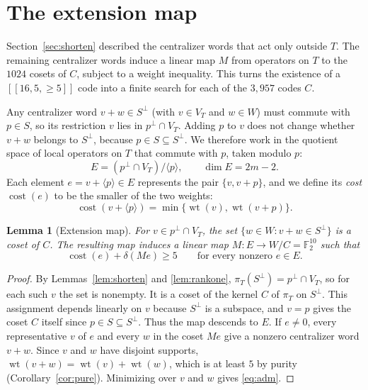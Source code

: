 \documentclass[11pt]{article}
\newtheorem{lemma}[theorem]{Lemma}
\theoremstyle{definition}
\theoremstyle{remark}
\newcommand{\F}{\mathbb F_2}
\newcommand{\qc}[1]{[\![#1]\!]}
\newcommand{\wt}{\operatorname{wt}}
\newcommand{\cost}{\operatorname{cost}}
\begin{document}
\section{The extension map}\label{sec:map}

Section~\ref{sec:shorten} described the centralizer words that act only
outside \(T\). The remaining centralizer words induce a linear map \(M\)
from operators on \(T\) to the \(1024\) cosets of \(C\), subject to a
weight inequality. This turns the existence of a
\(\qc{16,5,{\geq}5}\) code into a finite search for each of the
\(3{,}957\) codes \(C\).

Any centralizer word \(v+w\in S^\perp\) (with \(v\in V_T\) and
\(w\in W\)) must commute with \(p\in S\), so its restriction \(v\) lies
in \(p^\perp\cap V_T\). Adding \(p\) to \(v\) does not change whether
\(v+w\) belongs to \(S^\perp\), because \(p\in S\subseteq S^\perp\).
We therefore work in the quotient space of local operators on \(T\) that
commute with \(p\), taken modulo \(p\):
\[
 E=(p^\perp\cap V_T)/\langle p\rangle,\qquad \dim E=2m-2.
\]
Each element \(e=v+\langle p\rangle\in E\) represents the pair
\(\{v,v+p\}\), and we define its \emph{cost} \(\cost(e)\) to be the
smaller of the two weights:
\[
 \cost(v+\langle p\rangle)=\min\{\wt(v),\wt(v+p)\}.
\]

\begin{lemma}[Extension map]\label{lem:map}
For \(v\in p^\perp\cap V_T\), the set
\(\{w\in W:v+w\in S^\perp\}\) is a coset of \(C\). The resulting map
induces a linear map \(M:E\to W/C=\F^{10}\) such that
\begin{equation}\label{eq:adm}
 \cost(e)+\delta(Me)\geq5\qquad\text{for every nonzero }e\in E.
\end{equation}
\end{lemma}
\begin{proof}
By Lemmas~\ref{lem:shorten} and \ref{lem:rankone},
\(\pi_T(S^\perp)=p^\perp\cap V_T\), so for each such \(v\) the set is
nonempty. It is a coset of the kernel \(C\) of \(\pi_T\) on
\(S^\perp\). This assignment depends linearly on \(v\) because
\(S^\perp\) is a subspace, and \(v=p\) gives the coset \(C\) itself
since \(p\in S\subseteq S^\perp\). Thus the map descends to \(E\). If
\(e\neq0\), every representative \(v\) of \(e\) and every \(w\) in the
coset \(Me\) give a nonzero centralizer word \(v+w\). Since \(v\) and
\(w\) have disjoint supports, \(\wt(v+w)=\wt(v)+\wt(w)\), which is at
least \(5\) by purity (Corollary~\ref{cor:pure}). Minimizing over \(v\)
and \(w\) gives \eqref{eq:adm}.
\end{proof}
\end{document}
